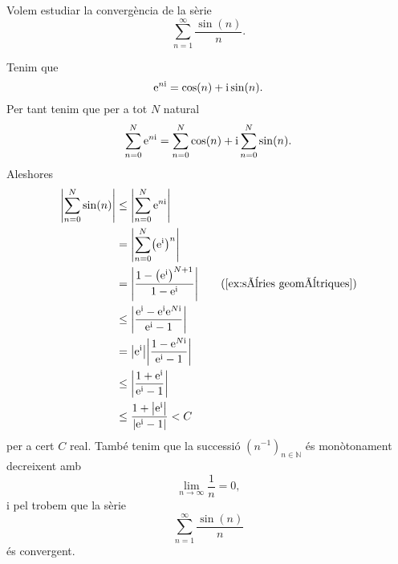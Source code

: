 \documentclass[../Apunts.tex]{subfiles}
\begin{document}
	\begin{example}%
		\label{ex:Teorema de Dirichlet per sèries numèriques}
		Volem estudiar la convergència de la sèrie
		\[\sum_{n=1}^{\infty}\frac{\sin(n)}{n}.\]
		\begin{solution} %
			Tenim que
			\[\mathrm{e}^{n\mathrm{i}}=\cos(n)+\mathrm{i}\sin(n).\]
			Per tant tenim que per a tot \(N\) natural
			\[\sum_{n=0}^{N}\mathrm{e}^{n\mathrm{i}}=\sum_{n=0}^{N}\cos(n)+\mathrm{i}\sum_{n=0}^{N}\sin(n).\]
			Aleshores
			\begin{align*}
				\abs{\sum_{n=0}^{N}\sin(n)}&\leq\abs{\sum_{n=0}^{N}\e^{n\iu}} \\
				&=\abs{\sum_{n=0}^{N}\left(\e^{\iu}\right)^{n}} \\
				&=\abs{\frac{1-\left(\e^{\iu}\right)^{N+1}}{1-\e^{\iu}}} \tag{\ref{ex:sèries geomètriques}}\\
				&\leq\abs{\frac{\e^{\iu}-\e^{\iu}\e^{N\iu}}{\e^{\iu}-1}} \\
				&=\abs{\e^{\iu}}\abs{\frac{1-\e^{N\iu}}{\e^{\iu}-1}} \\
				&\leq\abs{\frac{1+\e^{\iu}}{\e^{\iu}-1}} \\
				&\leq\frac{1+\abs{\e^{\iu}}}{\abs{\e^{\iu}-1}}<C \\
			\end{align*}
			per a cert \(C\) real. També tenim que la successió \((n^{-1})_{n\in\mathbb{N}}\) és monòtonament decreixent amb
			\[\lim_{n\to\infty}\frac{1}{n}=0,\]
			i pel  trobem que la sèrie
			\[\sum_{n=1}^{\infty}\frac{\sin(n)}{n}\]
			és convergent.
		\end{solution} %
	\end{example}
\end{document}
